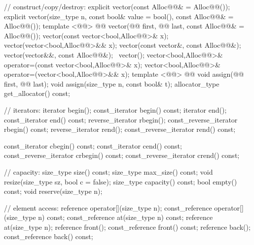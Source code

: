 \documentclass[american,twoside]{book}
\begin{document}
\begin{codeblock}
{{    // construct/copy/destroy:
    explicit vector(const Alloc@@& = Alloc@@());
    explicit vector(size_type n, const bool& value = bool(),
                    const Alloc@@& = Alloc@@());
    template <@@>
      @@
      vector(@@ first, @@ last,
             const Alloc@@& = Alloc@@());
    vector(const vector<bool,Alloc@@>& x);
    vector(vector<bool,Alloc@@>&& x);
    vector(const vector&, const Alloc@@&);
    vector(vector&&, const Alloc@@&);
   ~vector();
    vector<bool,Alloc@@>& operator=(const vector<bool,Alloc@@>& x);
    vector<bool,Alloc@@>& operator=(vector<bool,Alloc@@>&& x);
    template <@@>
      @@
      void assign(@@ first, @@ last);
    void assign(size_type n, const bool& t);
    allocator_type get_allocator() const;

    // iterators:
    iterator               begin();
    const_iterator         begin() const;
    iterator               end();
    const_iterator         end() const;
    reverse_iterator       rbegin();
    const_reverse_iterator rbegin() const;
    reverse_iterator       rend();
    const_reverse_iterator rend() const;

    const_iterator         cbegin() const;
    const_iterator         cend() const;
    const_reverse_iterator crbegin() const;
    const_reverse_iterator crend() const;

    // capacity:
    size_type size() const;
    size_type max_size() const;
    void      resize(size_type sz, bool c = false);
    size_type capacity() const;
    bool      empty() const;
    void      reserve(size_type n);

    // element access:
    reference       operator[](size_type n);
    const_reference operator[](size_type n) const;
    const_reference at(size_type n) const;
    reference       at(size_type n);
    reference       front();
    const_reference front() const;
    reference       back();
    const_reference back() const;

}}
\end{codeblock}
\end{document}
